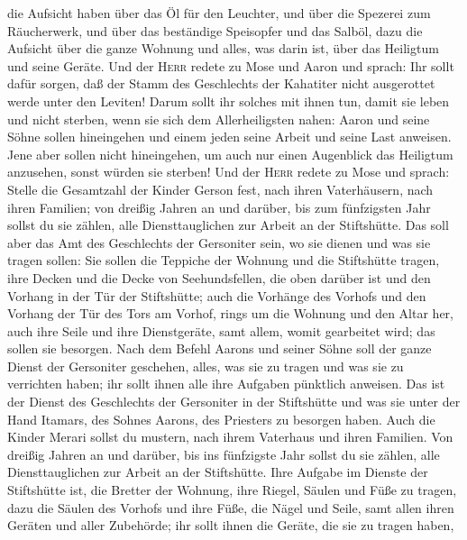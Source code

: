 die Aufsicht haben über das Öl für den Leuchter, und über die Spezerei
zum Räucherwerk, und über das beständige Speisopfer und das Salböl, dazu
die Aufsicht über die ganze Wohnung und alles, was darin ist, über das
Heiligtum und seine Geräte.  Und der \textsc{Herr} redete
zu Mose und Aaron und sprach:  Ihr sollt dafür sorgen,
daß der Stamm des Geschlechts der Kahatiter nicht ausgerottet werde
unter den Leviten!  Darum sollt ihr solches mit ihnen
tun, damit sie leben und nicht sterben, wenn sie sich dem
Allerheiligsten nahen: Aaron und seine Söhne sollen hineingehen und
einem jeden seine Arbeit und seine Last anweisen.  Jene
aber sollen nicht hineingehen, um auch nur einen Augenblick das
Heiligtum anzusehen, sonst würden sie sterben!  Und der
\textsc{Herr} redete zu Mose und sprach:  Stelle die
Gesamtzahl der Kinder Gerson fest, nach ihren Vaterhäusern, nach ihren
Familien;  von dreißig Jahren an und darüber, bis zum
fünfzigsten Jahr sollst du sie zählen, alle Diensttauglichen zur Arbeit
an der Stiftshütte.  Das soll aber das Amt des
Geschlechts der Gersoniter sein, wo sie dienen und was sie tragen
sollen:  Sie sollen die Teppiche der Wohnung und die
Stiftshütte tragen, ihre Decken und die Decke von Seehundsfellen, die
oben darüber ist und den Vorhang in der Tür der Stiftshütte;
 auch die Vorhänge des Vorhofs und den Vorhang der Tür
des Tors am Vorhof, rings um die Wohnung und den Altar her, auch ihre
Seile und ihre Dienstgeräte, samt allem, womit gearbeitet wird; das
sollen sie besorgen.  Nach dem Befehl Aarons und seiner
Söhne soll der ganze Dienst der Gersoniter geschehen, alles, was sie zu
tragen und was sie zu verrichten haben; ihr sollt ihnen alle ihre
Aufgaben pünktlich anweisen.  Das ist der Dienst des
Geschlechts der Gersoniter in der Stiftshütte und was sie unter der Hand
Itamars, des Sohnes Aarons, des Priesters zu besorgen haben.
 Auch die Kinder Merari sollst du mustern, nach ihrem
Vaterhaus und ihren Familien.  Von dreißig Jahren an und
darüber, bis ins fünfzigste Jahr sollst du sie zählen, alle
Diensttauglichen zur Arbeit an der Stiftshütte.  Ihre
Aufgabe im Dienste der Stiftshütte ist, die Bretter der Wohnung, ihre
Riegel, Säulen und Füße zu tragen,  dazu die Säulen des
Vorhofs und ihre Füße, die Nägel und Seile, samt allen ihren Geräten und
aller Zubehörde; ihr sollt ihnen die Geräte, die sie zu tragen haben,
